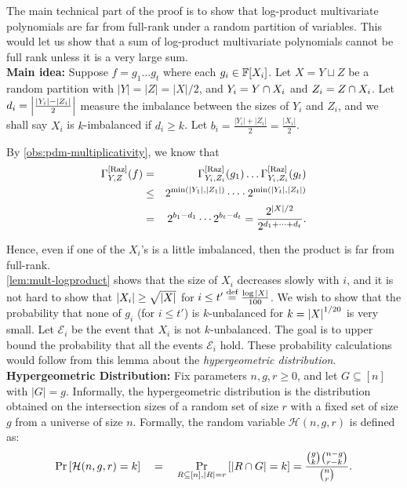 The main technical part of the proof is to show that log-product multivariate polynomials are far from full-rank under a random partition of variables. 
This would let us show that a sum of log-product multivariate polynomials cannot be full rank unless it is a very large sum.\\

{\bf Main idea: } Suppose $f = g_1 \dots g_t$ where each $g_i \in \mathbb{F}[X_i]$. 
Let $X = Y \sqcup Z$ be a random partition with $|Y| = |Z| = |X|/2$, and $Y_i = Y \cap X_i$ and $Z_i = Z \cap X_i$. 
Let $d_i = \left|\frac{|Y_i| - |Z_i|}{2}\right|$ measure the imbalance between the sizes of $Y_i$ and $Z_i$, and we shall say $X_i$ is $k$-imbalanced if $d_i \geq k$. 
Let $b_i = \frac{|Y_i| + |Z_i|}{2} = \frac{|X_i|}{2}$.

By \autoref{obs:pdm-multiplicativity}, we know that 
\begin{eqnarray*}
\Gamma^{\mathrm{[Raz]}}_{Y,Z}(f) & = & \Gamma^{\mathrm{[Raz]}}_{Y_i,Z_i}(g_1) \dots \Gamma^{\mathrm{[Raz]}}_{Y_i,Z_i}(g_t)\\
 & \leq & 2^{\min(|Y_1|,|Z_1|)} \cdots  \cdot 2^{\min(|Y_t|,|Z_t|)}\\ 
 & = & 2^{b_1  - d_1} \cdots 2^{b_t - d_t} = \frac{2^{|X|/2}}{2^{d_1 + \dots + d_t}}.
\end{eqnarray*}

Hence, even if one of the $X_i$'s is a little imbalanced, then the product is far from full-rank. \\

\autoref{lem:mult-logproduct} shows that the size of $X_i$ decreases slowly with $i$, and it is not hard to show that $\left|X_i\right| \geq \sqrt{\left|X\right|}$ for $i \leq t'\stackrel{\text{def}}{=}\frac{\log{\left|X\right|}}{100}$. 
We wish to show that the probability that none of $g_i$ (for $i\leq t'$) is $k$-unbalanced for $k = \left|X\right|^{1/20}$ is very small. 
Let $\mathcal{E}_i$ be the event that $X_i$ is not $k$-unbalanced. 
The goal is to upper bound the probability that all the events $\mathcal{E}_i$ hold. 
These probability calculations would follow from this lemma about the \emph{hypergeometric distribution}.\\

{\bf Hypergeometric Distribution: } Fix parameters $n, g, r \geq 0$, and let $G \subseteq [n]$ with $|G| = g$. 
Informally, the hypergeometric distribution is the distribution obtained on the intersection sizes of a random set of size $r$ with a fixed set of size $g$ from a universe of size $n$. 
Formally, the random variable $\mathcal{H}(n,g,r)$ is defined as:
$$
\Pr\left[\mathcal{H}(n,g,r) = k\right] \quad = \quad \Pr_{R\subseteq [n],|R| = r}\left[\left|R \cap G\right| = k\right] = \frac{\binom{g}{k}\binom{n-g}{r-k}}{\binom{n}{r}}.
$$


